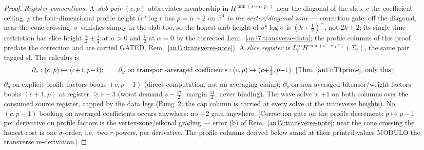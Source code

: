 \begin{proof}
\emph{Register conventions.} A \emph{slab pair} $(c,p)$ abbreviates membership
in $H^{\min(s-c,\,p^-)}$ near the diagonal of the slab, $c$ the coefficient
ceiling, $p$ the four-dimensional profile height ($r^\alpha\log r$ has $p=\alpha
+2$ on $\mathbb R^4$ \emph{in the vertex/diagonal zone} --- correction gate: off
the diagonal, near the cone crossing, $\sigma$ vanishes simply in the slab
too, so the honest slab height of $\sigma^k\log\sigma$ is $(k+\tfrac12)^-$,
not $2k+2$; its single-time restriction has slice height
$\tfrac\alpha2+\tfrac12$ at $\alpha>0$ and $\tfrac12$ at $\alpha=0$ by the
corrected Lem.~\ref{an17:transverse-data}; the profile columns of this proof
predate the correction and are carried GATED,
Rem.~\ref{an17:transverse-note}). A \emph{slice register}
is $L^\infty_t H^{\min(s-c,p^-)}(\Sigma_t)$, the same pair tagged $\mathrm{sl}$.
The calculus is
\[
 \partial_x:(c,p)\mapsto(c{+}1,p{-}1);\qquad
 \partial_y\ \text{on transport-averaged coefficients}:(c,p)\mapsto
 (c{+}\tfrac12,p{-}1)\ \ \textup{[Thm.~\ref{an17:T1prime}, only this]};
\]
$\partial_y$ on explicit profile factors books $(c,p{-}1)$ (direct computation,
not an averaging claim); $\partial_y$ on non-averaged bitensor/weight factors
books $(c{+}1,p)$ at register $\ge s-3$ (worst demand $s-\tfrac{17}2$: margin
$\tfrac{11}2$, never binding). The wave solve is $+1$ on both columns over the
consumed source register, capped by the data legs (Rung~2; the cap column is
carried at every solve at the transverse heights). No $(c,p{-}1)$ booking on
averaged coefficients occurs anywhere; no $+2$ gain anywhere. \textup{[Correction
gate on the profile decrement: $p\mapsto p{-}1$ per derivative on profile
factors is the vertex-zone/eikonal grading --- error (b) of
Rem.~\ref{an17:transverse-note}; near the cone crossing the honest cost is
one $\sigma$-order, i.e.\ two $r$-powers, per derivative. The profile columns
derived below stand at their printed values MODULO the transverse
re-derivation.]}


\end{proof}

